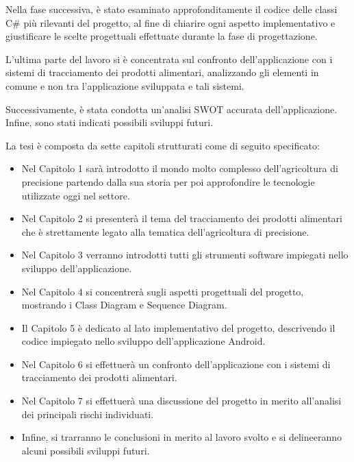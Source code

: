Nella fase successiva, è stato esaminato approfonditamente il codice delle classi C\# più rilevanti del progetto, al fine di chiarire ogni aspetto implementativo e giustificare le scelte progettuali effettuate durante la fase di progettazione.

L'ultima parte del lavoro si è concentrata sul confronto dell'applicazione con i sistemi di tracciamento dei prodotti alimentari, analizzando gli elementi in comune e non tra l'applicazione sviluppata e tali sistemi.

Successivamente, è stata condotta un'analisi SWOT accurata dell'applicazione. Infine, sono stati indicati possibili sviluppi futuri.

La tesi è composta da sette capitoli strutturati come di seguito specificato:
\begin{itemize}
	\item Nel Capitolo 1 sarà introdotto il mondo molto complesso dell'agricoltura di precisione partendo dalla sua storia per poi approfondire le tecnologie utilizzate oggi nel settore.
	\item Nel Capitolo 2 si presenterà il tema del tracciamento dei prodotti alimentari che è strettamente legato alla tematica dell'agricoltura di precisione.
	\item Nel Capitolo 3 verranno introdotti tutti gli strumenti software impiegati nello sviluppo dell'applicazione.
	\item Nel Capitolo 4 si concentrerà sugli aspetti progettuali del progetto, mostrando i Class Diagram e Sequence Diagram.
	\item Il Capitolo 5 è dedicato al lato implementativo del progetto, descrivendo il codice impiegato nello sviluppo dell'applicazione Android.
	\item Nel Capitolo 6 si effettuerà un confronto dell'applicazione con i sistemi di tracciamento dei prodotti alimentari.
	\item Nel Capitolo 7 si effettuerà una discussione del progetto in merito all'analisi dei principali rischi individuati.	
	\item Infine, si trarranno le conclusioni in merito al lavoro svolto e si delineeranno alcuni possibili sviluppi futuri.
\end{itemize}
